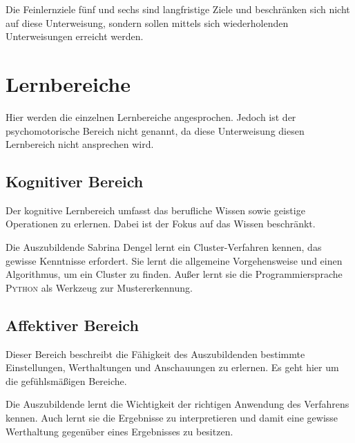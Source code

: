 Die Feinlernziele fünf und sechs sind langfristige Ziele und beschränken sich nicht auf diese Unterweisung, sondern sollen mittels sich wiederholenden Unterweisungen erreicht werden.

\section{Lernbereiche}
Hier werden die einzelnen Lernbereiche angesprochen. Jedoch ist der psychomotorische Bereich nicht genannt, da diese Unterweisung diesen Lernbereich nicht ansprechen wird.

\subsection{Kognitiver Bereich}
Der kognitive Lernbereich umfasst das berufliche Wissen sowie geistige Operationen zu erlernen. Dabei ist der Fokus auf das Wissen beschränkt. 
\par
Die Auszubildende Sabrina Dengel lernt ein Cluster-Verfahren kennen, das gewisse Kenntnisse erfordert. Sie lernt die allgemeine Vorgehensweise und einen Algorithmus, um ein Cluster zu finden. Außer lernt sie die Programmiersprache \textsc{Python} als Werkzeug zur Mustererkennung.

\subsection{Affektiver Bereich}
Dieser Bereich beschreibt die Fähigkeit des Auszubildenden bestimmte Einstellungen, Werthaltungen und Anschauungen zu erlernen. Es geht hier um die gefühlsmäßigen Bereiche.
\par
Die Auszubildende lernt die Wichtigkeit der richtigen Anwendung des Verfahrens kennen. Auch lernt sie die Ergebnisse zu interpretieren und damit eine gewisse Werthaltung gegenüber eines Ergebnisses zu besitzen.


